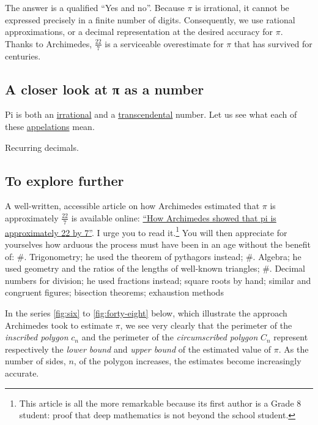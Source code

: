 \documentclass[
  a4paper,
]{article}
\begin{document}
The answer is a qualified ``Yes and no''. Because \(\pi\) is irrational,
it cannot be expressed precisely in a finite number of digits.
Consequently, we use rational approximations, or a decimal
representation at the desired accuracy for \(\pi\). Thanks to
Archimedes, \(\frac{22}{7}\) is a serviceable overestimate for \(\pi\)
that has survived for centuries.

\subsection{A closer look at π as a
number}\label{a-closer-look-at-ux3c0-as-a-number}

Pi is both an
\href{https://en.wikipedia.org/wiki/Irrational_number}{irrational} and a
\href{https://en.wikipedia.org/wiki/Transcendental_number}{transcendental}
number. Let us see what each of these
\href{https://www.merriam-webster.com/dictionary/appellation}{appelations}
mean.

Recurring decimals.

\subsection{To explore further}\label{to-explore-further}

A well-written, accessible article on how Archimedes estimated that
\(\pi\) is approximately \(\frac{22}{7}\) is available online:
\href{https://publications.azimpremjiuniversity.edu.in/3356/1/02-DaminiAndAbhishek_PiIs22By7_Final.pdf}{``How
Archimedes showed that pi is approximately 22 by 7''}. I urge you to
read it.\footnote{This article is all the more remarkable because its
  first author is a Grade 8 student: proof that deep mathematics is not
  beyond the school student.} You will then appreciate for yourselves
how arduous the process must have been in an age without the benefit of:
\#. Trigonometry; he used the theorem of pythagors instead; \#. Algebra;
he used geometry and the ratios of the lengths of well-known triangles;
\#. Decimal numbers for division; he used fractions instead; square
roots by hand; similar and congruent figures; bisection theorems;
exhaustion methods

In the series \cref{fig:six} to \cref{fig:forty-eight} below, which
illustrate the approach Archimedes took to estimate \(\pi\), we see very
clearly that the perimeter of the \emph{inscribed polygon} \(c_n\) and
the perimeter of the \emph{circumscribed polygon} \(C_n\) represent
respectively the \emph{lower bound} and \emph{upper bound} of the
estimated value of \(\pi\). As the number of sides, \(n\), of the
polygon increases, the estimates become increasingly accurate.
\end{document}

